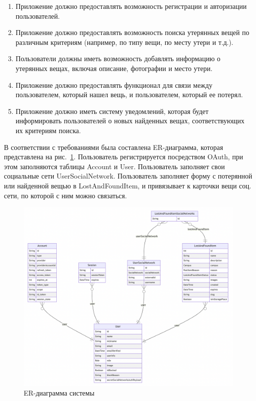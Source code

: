 \begin{enumerate}
	\item Приложение должно предоставлять возможность регистрации и авторизации пользователей.
	\item Приложение должно предоставлять возможность поиска утерянных вещей по различным критериям (например, по типу вещи, по месту утери и т.д.).
	\item Пользователи должны иметь возможность добавлять информацию о утерянных вещах, включая описание, фотографии и место утери.
	\item Приложение должно предоставлять функционал для связи между пользователем, который нашел вещь, и пользователем, который ее потерял.
	\item Приложение должно иметь систему уведомлений, которая будет информировать пользователей о новых найденных вещах, соответствующих их критериям поиска.
\end{enumerate}

В соответствии с требованиями была составлена ER-диаграмма, которая представлена на рис.~\ref{fig:erd}. Пользователь регистрируется посредством OAuth, при этом заполняются таблицы Account и User. Пользователь заполняет свои социальные сети UserSocialNetwork. Пользователь заполняет форму с потерянной или найденной вещью в LostAndFoundItem, и привязывает к карточки вещи соц. сети, по которой с ним можно связаться.

\begin{figure}[htb]
	\centering
	\includegraphics[width=.95\textwidth]{images/erd}
	\parskip=6pt
	\caption{ER-диаграмма системы}
	\label{fig:erd}
\end{figure}

